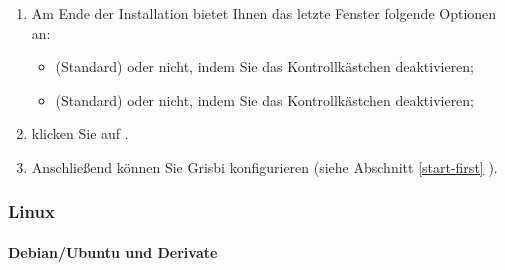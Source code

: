\begin{enumerate}
	\item Am Ende der Installation bietet Ihnen das letzte Fenster folgende Optionen an:
	\begin{itemize}
		\item {} (Standard) oder nicht, indem Sie das Kontrollkästchen deaktivieren;
		\item {} (Standard) oder nicht, indem Sie das Kontrollkästchen deaktivieren;
	\end{itemize}
	\item klicken Sie auf .
	\item Anschließend können Sie Grisbi konfigurieren (siehe Abschnitt \vref{start-first} ).
\end{enumerate}

\subsubsection{Linux\label{start-install-stable-linux}}

\paragraph{Debian/Ubuntu und Derivate}\mbox{}		%

